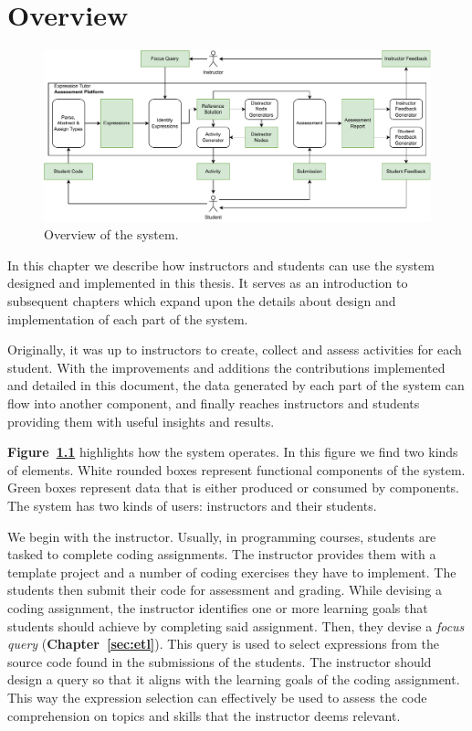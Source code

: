 \chapter{Overview}

\begin{chapterBody}


\begin{figure}[ht]
    \centering
    \includegraphics[width=\textwidth]{res/3/et_loop.drawio.pdf}
    \caption{Overview of the system.}
    \label{fig:intro-et-loop}
\end{figure}

In this chapter we describe how instructors and students can use the system 
designed and implemented in this thesis. It serves as an introduction to
subsequent chapters which expand upon the details about design and implementation
of each part of the system.

Originally, it was up to instructors to create, collect and assess activities for
each student.
With the improvements and additions the contributions implemented and detailed in
this document, the data generated by each part of the system can flow into another
component, and finally reaches instructors and students providing them with
useful insights and results.

\textbf{Figure~\ref{fig:intro-et-loop}} highlights how the system operates.
In this figure we find two kinds of elements. White rounded boxes represent
functional components of the system. Green boxes represent data that is either
produced or consumed by components.
The system has two kinds of users: instructors and their students.

We begin with the instructor. 
Usually, in programming courses, students are tasked to complete coding
assignments. The instructor provides them with a template project and
a number of coding exercises they have to implement. The students then
submit their code for assessment and grading.
While devising a coding assignment, the instructor identifies one or
more learning goals that students should achieve by completing said
assignment.
Then, they devise a \textit{focus query} (\textbf{Chapter~\ref{sec:etl}}).
This query is used to select expressions from the source code found in the
submissions of the students. The instructor should design a query so that
it aligns with the learning goals of the coding assignment. This way
the expression selection can effectively be used to assess the code 
comprehension on topics and skills that the instructor deems relevant.


\end{chapterBody}
